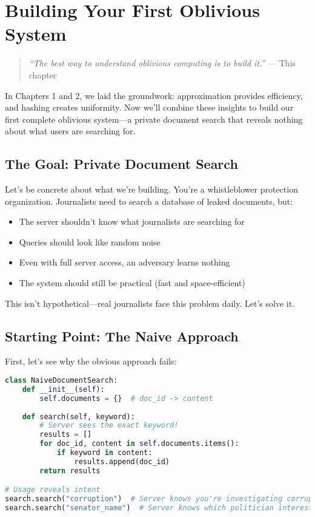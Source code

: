 \chapter{Building Your First Oblivious System}
\label{ch:first_oblivious}

\begin{quote}
\emph{``The best way to understand oblivious computing is to build it.''} — This chapter
\end{quote}

In Chapters 1 and 2, we laid the groundwork: approximation provides efficiency, and hashing creates uniformity. Now we'll combine these insights to build our first complete oblivious system—a private document search that reveals nothing about what users are searching for.

\section{The Goal: Private Document Search}

Let's be concrete about what we're building. You're a whistleblower protection organization. Journalists need to search a database of leaked documents, but:

\begin{itemize}
    \item The server shouldn't know what journalists are searching for
    \item Queries should look like random noise
    \item Even with full server access, an adversary learns nothing
    \item The system should still be practical (fast and space-efficient)
\end{itemize}

This isn't hypothetical—real journalists face this problem daily. Let's solve it.

\section{Starting Point: The Naive Approach}

First, let's see why the obvious approach fails:

\begin{lstlisting}[language=Python, caption=Naive search reveals everything]
class NaiveDocumentSearch:
    def __init__(self):
        self.documents = {}  # doc_id -> content
    
    def search(self, keyword):
        # Server sees the exact keyword!
        results = []
        for doc_id, content in self.documents.items():
            if keyword in content:
                results.append(doc_id)
        return results

# Usage reveals intent
search.search("corruption")  # Server knows you're investigating corruption
search.search("senator_name")  # Server knows which politician interests you
\end{lstlisting}

